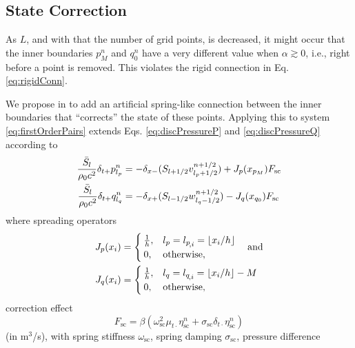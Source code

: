 \subsection{State Correction}
As $L$, and with that the number of grid points, is decreased, it might occur that the inner boundaries $p_M^n$ and $q_0^n$ have a very different value when $\alpha \gtrsim 0$, i.e., right before a point is removed. This violates the rigid connection in Eq. \eqref{eq:rigidConn}. 

We propose in \cite{Willemsen2021} to add an artificial spring-like connection between the inner boundaries that ``corrects'' the state of these points. Applying this to system \eqref{eq:firstOrderPairs} extends Eqs. \eqref{eq:discPressureP} and \eqref{eq:discPressureQ} according to
\begin{subequations}
    \begin{align}
        \frac{\bar S_{l}}{\rho_0 c^2}\delta_{t+}p_{l_p}^n &= -\delta_{x-}(S_{{l}+1/2}v_{{l_p}+1/2}^{n+1/2}) + J_p(x_{p_M})F_\text{sc}\label{eq:pWithSC}\\
        \frac{\bar S_{l}}{\rho_0 c^2}\delta_{t+}q_{l_q}^n &= -\delta_{x+}(S_{{l}-1/2}w_{{l_q}-1/2}^{n+1/2}) - J_q(x_{q_0})F_\text{sc}\label{eq:qWithSC}
    \end{align}
\end{subequations}
where spreading operators
\begin{equation}\label{eq:spreadingOperators}
    \begin{aligned}
    J_p(x_i)& =
    \begin{cases}
        \frac{1}{h}, & {l_p} = {l_p}_{\!,i} = \lfloor x_i/h\rfloor\\
        0,& \text{otherwise},
    \end{cases}
    \quad\text{and}\\
    J_q(x_i) &=
    \begin{cases}
        \frac{1}{h}, & {l_q} = {l_q}_{\!,i} = \lfloor x_i/h \rfloor - M\\
        0,& \text{otherwise},
    \end{cases}
\end{aligned}
\end{equation}
correction effect
\begin{equation}\label{eq:scForce}
    F_\text{sc} = \beta\left(\omega_\text{sc}^2\mu_{t\cdot}\eta_\text{sc}^n+\sigma_\text{sc}\delta_{t\cdot}\eta_\text{sc}^n\right)
\end{equation}
(in m$^{3}$/s), with spring stiffness $\omega_\text{sc}$, spring damping $\sigma_\text{sc}$, pressure difference
